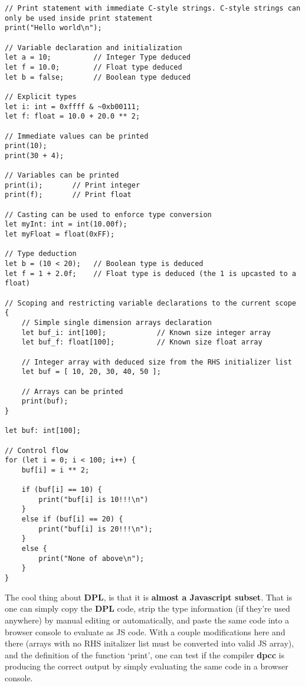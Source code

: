 \documentclass[a4paper]{article}
\begin{document}
\begin{lstlisting}[language=DPL]
// Print statement with immediate C-style strings. C-style strings can only be used inside print statement
print("Hello world\n");

// Variable declaration and initialization
let a = 10;          // Integer Type deduced
let f = 10.0;        // Float type deduced
let b = false;       // Boolean type deduced

// Explicit types
let i: int = 0xffff & ~0xb00111;
let f: float = 10.0 + 20.0 ** 2;

// Immediate values can be printed
print(10);
print(30 + 4);

// Variables can be printed
print(i);       // Print integer
print(f);       // Print float

// Casting can be used to enforce type conversion
let myInt: int = int(10.00f);
let myFloat = float(0xFF);

// Type deduction
let b = (10 < 20);   // Boolean type is deduced
let f = 1 + 2.0f;    // Float type is deduced (the 1 is upcasted to a float)

// Scoping and restricting variable declarations to the current scope
{
    // Simple single dimension arrays declaration
    let buf_i: int[100];            // Known size integer array
    let buf_f: float[100];          // Known size float array

    // Integer array with deduced size from the RHS initializer list
    let buf = [ 10, 20, 30, 40, 50 ];

    // Arrays can be printed
    print(buf);
}

let buf: int[100];

// Control flow
for (let i = 0; i < 100; i++) {
    buf[i] = i ** 2;

    if (buf[i] == 10) {
        print("buf[i] is 10!!!\n")
    }
    else if (buf[i] == 20) {
        print("buf[i] is 20!!!\n");
    }
    else {
        print("None of above\n");
    }
}
\end{lstlisting}

The cool thing about \textbf{DPL}, is that it is \textbf{almost a Javascript subset}.
That is one can simply copy the \textbf{DPL} code, strip the type information (if they're used
anywhere) by manual editing or automatically, and paste the same code into a browser console to evaluate as JS code.
With a couple modifications here and there (arrays with no RHS initalizer list must be converted into valid
JS array), and the definition of the function `print', one can
test if the compiler \textbf{dpcc} is producing the correct output by simply
evaluating the same code in a browser console.
\end{document}
